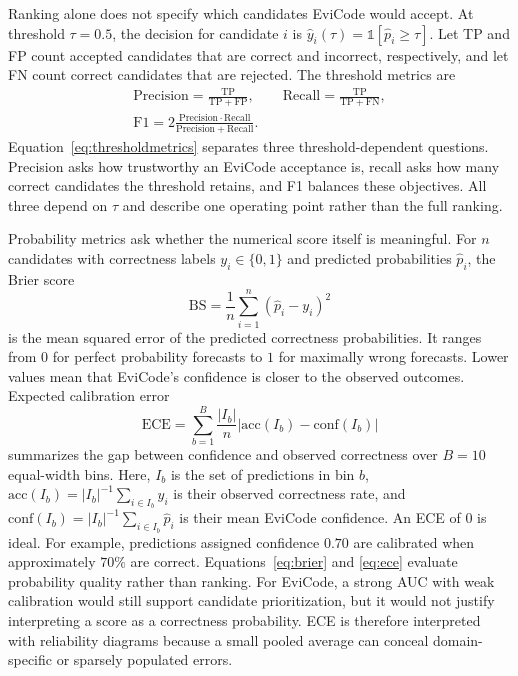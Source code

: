 \documentclass[conference]{IEEEtran}
\begin{document}
Ranking alone does not specify which candidates EviCode would accept. At threshold $\tau=0.5$, the decision for candidate $i$ is $\hat y_i(\tau)=\mathbb{1}[\hat p_i\geq\tau]$. Let TP and FP count accepted candidates that are correct and incorrect, respectively, and let FN count correct candidates that are rejected. The threshold metrics are
\begin{equation}
\begin{gathered}
\mathrm{Precision}=\frac{\mathrm{TP}}{\mathrm{TP}+\mathrm{FP}},\qquad
\mathrm{Recall}=\frac{\mathrm{TP}}{\mathrm{TP}+\mathrm{FN}},\\
\mathrm{F1}=2\frac{\mathrm{Precision}\cdot\mathrm{Recall}}
{\mathrm{Precision}+\mathrm{Recall}}.
\end{gathered}
\label{eq:thresholdmetrics}
\end{equation}
Equation~\ref{eq:thresholdmetrics} separates three threshold-dependent questions. Precision asks how trustworthy an EviCode acceptance is, recall asks how many correct candidates the threshold retains, and F1 balances these objectives. All three depend on $\tau$ and describe one operating point rather than the full ranking.

Probability metrics ask whether the numerical score itself is meaningful. For $n$ candidates with correctness labels $y_i\in\{0,1\}$ and predicted probabilities $\hat p_i$, the Brier score
\begin{equation}
\mathrm{BS}=\frac{1}{n}\sum_{i=1}^{n}(\hat p_i-y_i)^2
\label{eq:brier}
\end{equation}
is the mean squared error of the predicted correctness probabilities. It ranges from $0$ for perfect probability forecasts to $1$ for maximally wrong forecasts. Lower values mean that EviCode's confidence is closer to the observed outcomes. Expected calibration error
\begin{equation}
\mathrm{ECE}=\sum_{b=1}^{B}\frac{|I_b|}{n}\left|\mathrm{acc}(I_b)-\mathrm{conf}(I_b)\right|
\label{eq:ece}
\end{equation}
summarizes the gap between confidence and observed correctness over $B=10$ equal-width bins. Here, $I_b$ is the set of predictions in bin $b$, $\mathrm{acc}(I_b)=|I_b|^{-1}\sum_{i\in I_b}y_i$ is their observed correctness rate, and $\mathrm{conf}(I_b)=|I_b|^{-1}\sum_{i\in I_b}\hat p_i$ is their mean EviCode confidence. An ECE of $0$ is ideal. For example, predictions assigned confidence $0.70$ are calibrated when approximately $70\%$ are correct. Equations~\ref{eq:brier} and \ref{eq:ece} evaluate probability quality rather than ranking. For EviCode, a strong AUC with weak calibration would still support candidate prioritization, but it would not justify interpreting a score as a correctness probability. ECE is therefore interpreted with reliability diagrams because a small pooled average can conceal domain-specific or sparsely populated errors.
\end{document}
